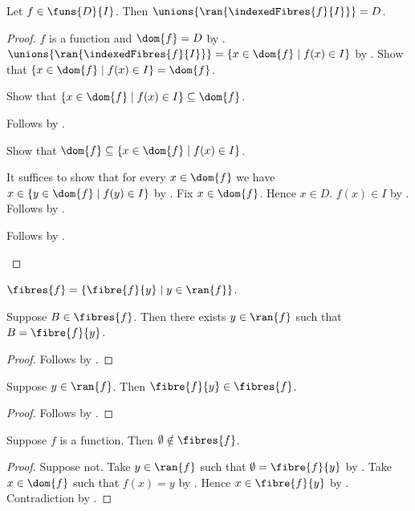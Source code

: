 \begin{proposition}\label{indexed_fibres_cover_domain}
    Let $f\in\funs{D}{I}$.
    Then $\unions{\ran{\indexedFibres{f}{I}}}=D$.
\end{proposition}
\begin{proof}
    $f$ is a function and $\dom{f}=D$
        by .
    $\unions{\ran{\indexedFibres{f}{I}}}
        =\{x\in\dom{f}\mid f(x)\in I\}$
        by .
    Show that $\{x\in\dom{f}\mid f(x)\in I\}=\dom{f}$.
    \begin{subproof}
        Show that $\{x\in\dom{f}\mid f(x)\in I\}\subseteq\dom{f}$.
        \begin{subproof}
            Follows by .
        \end{subproof}
        Show that $\dom{f}\subseteq\{x\in\dom{f}\mid f(x)\in I\}$.
        \begin{subproof}
            It suffices to show that for every $x\in\dom{f}$
                we have $x\in\{y\in\dom{f}\mid f(y)\in I\}$
                by .
            Fix $x\in\dom{f}$.
            Hence $x\in D$.
            $f(x)\in I$ by .
            Follows by \auto.
        \end{subproof}
        Follows by .
    \end{subproof}
\end{proof}

\begin{definition}\label{function_fibres}
    $\fibres{f}=\{\fibre{f}{y}\mid y\in\ran{f}\}$.
\end{definition}

\begin{proposition}\label{function_fibres_elim}
    Suppose $B\in\fibres{f}$.
    Then there exists $y\in\ran{f}$ such that $B=\fibre{f}{y}$.
\end{proposition}
\begin{proof}
    Follows by .
\end{proof}

\begin{proposition}\label{function_fibres_intro}
    Suppose $y\in\ran{f}$.
    Then $\fibre{f}{y}\in\fibres{f}$.
\end{proposition}
\begin{proof}
    Follows by .
\end{proof}

\begin{proposition}\label{function_fibres_nonempty}
    Suppose $f$ is a function.
    Then $\emptyset\notin\fibres{f}$.
\end{proposition}
\begin{proof}
    Suppose not.
    Take $y\in\ran{f}$ such that $\emptyset=\fibre{f}{y}$
        by .
    Take $x\in\dom{f}$ such that $f(x)=y$ by .
    Hence $x\in\fibre{f}{y}$ by .
    Contradiction by .
\end{proof}

